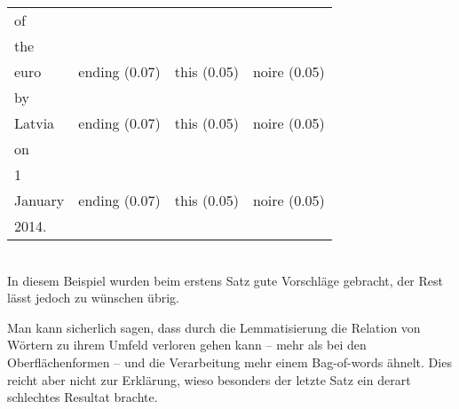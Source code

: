 \documentclass[11pt,twoside,openright]{mpreport}
\begin{document}
\begin{footnotesize}
\begin{tabular}{|llll|}
of & & & \\
the & & & \\
euro                    & ending (0.07) & this (0.05) & noire (0.05) \\
by & & & \\
Latvia                  & ending (0.07) & this (0.05) & noire (0.05) \\
on & & & \\
1 & & & \\
January                 & ending (0.07) & this (0.05) & noire (0.05) \\
2014. & & & \\
\hline
\end{tabular}\end{footnotesize}\\

In diesem Beispiel wurden beim erstens Satz gute Vorschläge gebracht, der Rest lässt jedoch zu wünschen übrig.

Man kann sicherlich sagen, dass durch die Lemmatisierung die Relation von Wörtern zu ihrem Umfeld verloren gehen kann -- mehr als bei den Oberflächenformen -- und die Verarbeitung mehr einem Bag-of-words ähnelt. Dies reicht aber nicht zur Erklärung, wieso besonders der letzte Satz ein derart schlechtes Resultat brachte.
\end{document}
